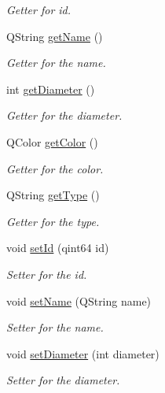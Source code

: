 \begin{DoxyCompactItemize}
\begin{DoxyCompactList}\small\item\em \-Getter for id. \end{DoxyCompactList}\item 
\-Q\-String \hyperlink{classHeavenlyBody_aae80e4f1c9137c9b2e6b347922dceda9}{get\-Name} ()
\begin{DoxyCompactList}\small\item\em \-Getter for the name. \end{DoxyCompactList}\item 
int \hyperlink{classHeavenlyBody_ad651361998ff71d6d6920f5eb2702096}{get\-Diameter} ()
\begin{DoxyCompactList}\small\item\em \-Getter for the diameter. \end{DoxyCompactList}\item 
\-Q\-Color \hyperlink{classHeavenlyBody_aa1c57765937f0f168833419750cb4eb3}{get\-Color} ()
\begin{DoxyCompactList}\small\item\em \-Getter for the color. \end{DoxyCompactList}\item 
\-Q\-String \hyperlink{classHeavenlyBody_a394c8fd1124731237b6738bb395fb705}{get\-Type} ()
\begin{DoxyCompactList}\small\item\em \-Getter for the type. \end{DoxyCompactList}\item 
void \hyperlink{classHeavenlyBody_a4840f293abcba420f954f969d8de26d9}{set\-Id} (qint64 id)
\begin{DoxyCompactList}\small\item\em \-Setter for the id. \end{DoxyCompactList}\item 
void \hyperlink{classHeavenlyBody_af15530ccfc1016f258ce0017b1b1efd6}{set\-Name} (\-Q\-String name)
\begin{DoxyCompactList}\small\item\em \-Setter for the name. \end{DoxyCompactList}\item 
void \hyperlink{classHeavenlyBody_a1b2df4229d1a826edf039655bca1eec9}{set\-Diameter} (int diameter)
\begin{DoxyCompactList}\small\item\em \-Setter for the diameter. \end{DoxyCompactList}\item 

\end{DoxyCompactItemize}
